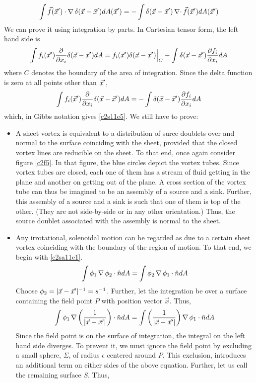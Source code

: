 \begin{enumerate}
\begin{equation}\label{c2s11e5}
\int \vec{f}(\vec{x}^\prime)\cdot\operatorname{\nabla}\delta(\vec{x} - \vec{x}^\prime) dA(\vec{x}^\prime) = -\int \delta(\vec{x} - \vec{x}^\prime)\operatorname{\nabla\cdot}\vec{f}(\vec{x}^\prime) dA(\vec{x}^\prime)
\end{equation}
We can prove it using integration by parts. In Cartesian tensor form, the left hand side is
\[
\int f_i(\vec{x}^\prime)\frac{\partial}{\partial x_i}\delta(\vec{x} - \vec{x}^\prime)dA=f_i(\vec{x}^\prime)\delta(\vec{x} - \vec{x}^\prime)\Big|_C - \int\delta(\vec{x} - \vec{x}^\prime)\frac{\partial{f_i}}{\partial{x_i}}dA
\]
where $C$ denotes the boundary of the area of integration. Since the delta function is zero at all points other than $\vec{x}^\prime$,
\[
\int f_i(\vec{x}^\prime)\frac{\partial}{\partial x_i}\delta(\vec{x} - \vec{x}^\prime)dA = -\int\delta(\vec{x} - \vec{x}^\prime)\frac{\partial{f_i}}{\partial{x_i}}dA
\]
which, in Gibbs notation gives \eqref{c2s11e5}. We still have to prove:
\begin{itemize}
\item A sheet vortex is equivalent to a distribution of surce doublets over and normal to the surface coinciding with the sheet, provided that the closed vortex lines are reducible on 
the sheet. To that end, once again consider figure \ref{c2f5}. In that figure, the blue circles depict the vortex tubes. Since vortex tubes are closed, each one of them has a stream of
fluid getting in the plane and another on getting out of the plane. A cross section of the vortex tube can thus be imagined to be an assembly of a source and a sink. Further, this
assembly of a source and a sink is such that one of them is top of the other. (They are not side-by-side or in any other orientation.) Thus, the source doublet associated with the
assembly is normal to the sheet.
\item Any irrotational, solenoidal motion can be regarded as due to a certain sheet vortex coinciding with the boundary of the region of motion. To that end,
we begin with \eqref{c2sa11e1}.
\[
\int\phi_1\operatorname{\nabla}\phi_2\cdot\hat{n} dA = \int\phi_2\operatorname{\nabla}\phi_1\cdot\hat{n} dA
\]
Choose $\phi_2 = |\vec{x} - \vec{x}^\prime|^{-1} = s^{-1}$. Further, let the integration be over a surface containing the field point $P$ with position vector $\vec{x}$. Thus,
\[
\int\phi_1\operatorname{\nabla}\left(\frac{1}{|\vec{x} - \vec{x}^\prime|}\right)\cdot\hat{n} dA = \int\left(\frac{1}{|\vec{x} - \vec{x}^\prime|}\right)\operatorname{\nabla}\phi_1\cdot\hat{n} dA
\]
Since the field point is on the surface of integration, the integral on the left hand side diverges. To prevent it, we must ignore the field point by excluding a small sphere, $\Sigma$, 
of radius $\epsilon$ centered around $P$. This exclusion, introduces an additional term on either sides of the above equation. Further, let us call the remaining surface $S$. Thus,

\end{itemize}
\end{enumerate}
